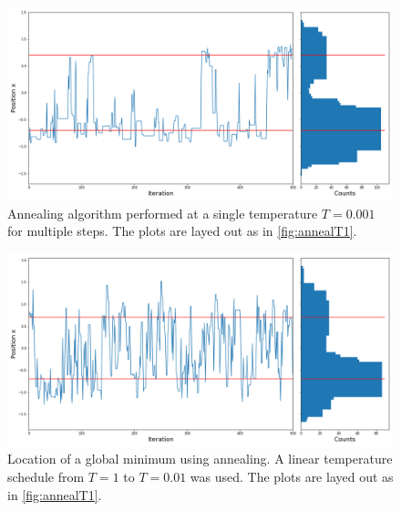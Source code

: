 \documentclass[twocolumn]{article}
\begin{document}
\begin{figure}
\centering
\includegraphics[width=\linewidth]{annealT01}
\caption{Annealing algorithm performed at a single temperature $T=0.001$ for multiple steps. The plots are layed out as in \ref{fig:annealT1}.}
\label{fig:annealT01}
\end{figure}

\begin{figure}
	\centering
	\includegraphics[width=\linewidth]{anneal_full}
	\caption{Location of a global minimum using annealing. A linear temperature schedule from $T=1$ to $T=0.01$ was used. The plots are layed out as in \ref{fig:annealT1}.}
	\label{fig:anneal_full}
\end{figure}
\end{document}
